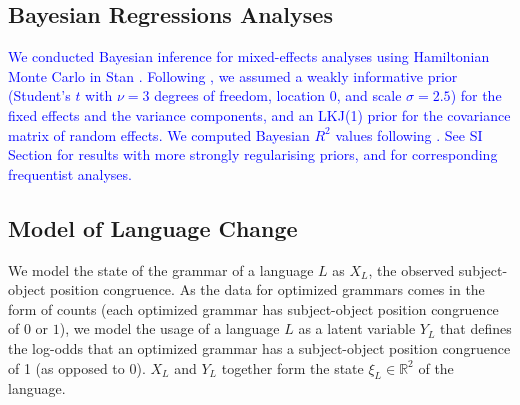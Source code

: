 \documentclass[9pt,twocolumn,twoside,lineno]{pnas-new}
\begin{document}
{\subsection*{Bayesian Regressions Analyses}
\textcolor{blue}{
We conducted Bayesian inference for mixed-effects analyses using Hamiltonian Monte Carlo in Stan \citep{homan2014the,carpenter2017stan, buerkner2017brms}.
Following \citep{burkner2018advanced}, we assumed a weakly informative prior (Student's $t$ with $\nu=3$ degrees of freedom, location 0, and scale $\sigma=2.5$) for the fixed effects and the variance components, and an LKJ(1) prior \citep{lewandowski2009generating} for the covariance matrix of random effects. %
We computed Bayesian $R^2$ values following \cite{gelman2019r}.
See SI Section for results with more strongly regularising priors, and for corresponding frequentist analyses.
}



\subsection*{Model of Language Change}



We model the state of the grammar of a language $L$ as $X_L$, the observed subject-object position congruence.
As the data for optimized grammars comes in the form of counts (each optimized grammar has subject-object position congruence of $0$ or $1$), we model the usage of a language $L$ as a latent variable $Y_L$ that defines the log-odds that an optimized grammar has a subject-object position congruence of 1 (as opposed to 0).
$X_L$ and $Y_L$ together form the state $\xi_L \in \mathbb{R}^2$  of the language.



}
\end{document}
